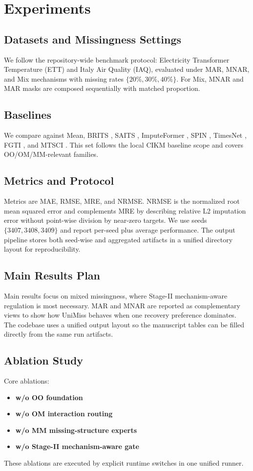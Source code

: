 \section{Experiments}

\subsection{Datasets and Missingness Settings}
We follow the repository-wide benchmark protocol: Electricity Transformer Temperature (ETT) and Italy Air Quality (IAQ), evaluated under MAR, MNAR, and Mix mechanisms with missing rates $\{20\%,30\%,40\%\}$. For Mix, MNAR and MAR masks are composed sequentially with matched proportion.

\subsection{Baselines}
We compare against Mean, BRITS \cite{cao2018brits}, SAITS \cite{du2023saits}, ImputeFormer \cite{liu2024imputeformer}, SPIN \cite{marisca2022spin}, TimesNet \cite{wu2023timesnet}, FGTI \cite{chen2024fgti}, and MTSCI \cite{liu2024mtsci}. This set follows the local CIKM baseline scope and covers OO/OM/MM-relevant families.

\subsection{Metrics and Protocol}
Metrics are MAE, RMSE, MRE, and NRMSE. NRMSE is the normalized root mean squared error and complements MRE by describing relative L2 imputation error without point-wise division by near-zero targets. We use seeds $\{3407,3408,3409\}$ and report per-seed plus average performance. The output pipeline stores both seed-wise and aggregated artifacts in a unified directory layout for reproducibility.

\subsection{Main Results Plan}
Main results focus on mixed missingness, where Stage-II mechanism-aware regulation is most necessary. MAR and MNAR are reported as complementary views to show how UniMiss behaves when one recovery preference dominates. The codebase uses a unified output layout so the manuscript tables can be filled directly from the same run artifacts.

\subsection{Ablation Study}
Core ablations:
\begin{itemize}
\item \textbf{w/o OO foundation}
\item \textbf{w/o OM interaction routing}
\item \textbf{w/o MM missing-structure experts}
\item \textbf{w/o Stage-II mechanism-aware gate}
\end{itemize}
These ablations are executed by explicit runtime switches in one unified runner.

